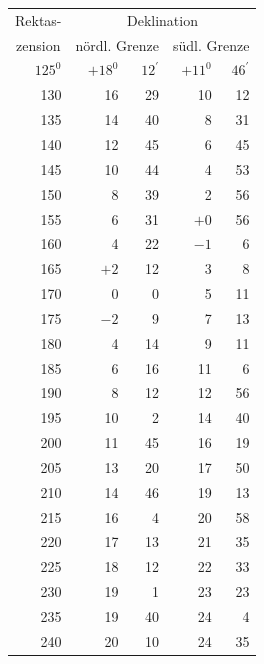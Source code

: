 \begin{center}
\begin{tabular}{|r|r@{\;}r|r@{\;}r|}
\multicolumn{1}{|c|}{Rektas-}&\multicolumn{4}{c|}{Deklination}\\
\multicolumn{1}{|c|}{zension}&\multicolumn{2}{c|}{nördl. Grenze}&\multicolumn{2}{c|}{südl. Grenze}\\
\(125^{0}\)&\(+18^{0}\)&\(12^{\prime}\)&\(+11^{0}\)&\(46^{\prime}\)\\
130&16&29&10&12\\
135&14&40&8&31\\
140&12&45&6&45\\
145&10&44&4&53\\
150&8&39&2&56\\
155&6&31&\(+0\)&56\\
160&4&22&\(-1\)&6\\
165&\(+2\)&12&3&8\\
170&0&0&5&11\\
175&\(-2\)&9&7&13\\
180&4&14&9&11\\
185&6&16&11&6\\
190&8&12&12&56\\
195&10&2&14&40\\
200&11&45&16&19\\
205&13&20&17&50\\
210&14&46&19&13\\
215&16&4&20&58\\
220&17&13&21&35\\
225&18&12&22&33\\
230&19&1&23&23\\
235&19&40&24&4\\
240&20&10&24&35\\\hline
\end{tabular}
\end{center}
